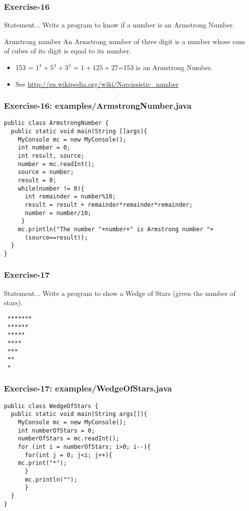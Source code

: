 \documentclass[xcolor=dvipsnames,dvip,notes=show,handout,table]{beamer}
\begin{document}
\begin{frame}[fragile]
\frametitle{Exercise-16}
\begin{block}{Statement...}
 Write a program to know if a number is an Armstrong Number.
\end{block}

\begin{exampleblock}{Armstrong number}
 An Armstrong number of three digit is a number whose sum of cubes of its digit is equal to its number. 
  \begin{itemize}
   \item  153 = $1^3+5^3+3^3$ = $1+125+27$=153 is an Armstrong Number.
   \item  See \url{http://en.wikipedia.org/wiki/Narcissistic\_number}
  \end{itemize}

\end{exampleblock}


\end{frame}


\begin{frame}[fragile]
\frametitle{Exercise-16: examples/ArmstrongNumber.java}
\scriptsize
\begin{lstlisting}
public class ArmstrongNumber {
  public static void main(String []args){
    MyConsole mc = new MyConsole();
    int number = 0;
    int result, source;
    number = mc.readInt();
    source = number;
    result = 0;
    while(number != 0){
      int remainder = number%10;
      result = result + remainder*remainder*remainder;
      number = number/10;
     }
    mc.println("The number "+number+" is Armstrong number "+
      (source==result));        
  }
}
\end{lstlisting}
\end{frame}


\begin{frame}[fragile]
\frametitle{Exercise-17}
\begin{block}{Statement...}
 Write a program to show a Wedge of Stars (given the number of stars).
\end{block}

\begin{lstlisting}
 *******
 ******
 *****
 ****
 ***
 **
 *
\end{lstlisting}



\end{frame}


\begin{frame}[fragile]
\frametitle{Exercise-17: examples/WedgeOfStars.java}
\scriptsize
\begin{lstlisting}
public class WedgeOfStars {
  public static void main(String args[]){
    MyConsole mc = new MyConsole();
    int numberOfStars = 0;
    numberOfStars = mc.readInt();
    for (int i = numberOfStars; i>0; i--){
      for(int j = 0; j<i; j++){
	mc.print("*");
      }
      mc.println("");
      }
  }
}
\end{lstlisting}
\end{frame}
\end{document}

